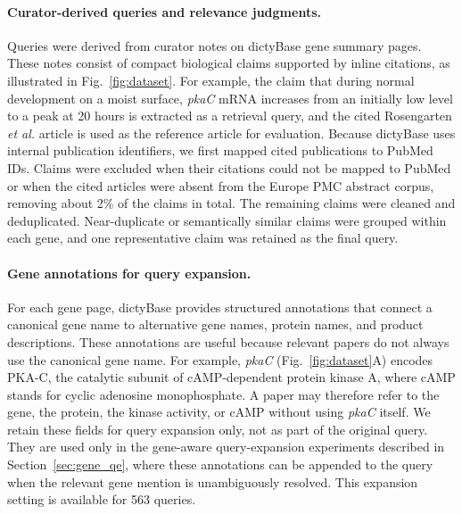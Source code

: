 \documentclass[runningheads]{llncs}
\begin{document}
\paragraph{Curator-derived queries and relevance judgments.}
Queries were derived from curator notes on dictyBase gene summary pages. 
These notes consist of compact biological claims supported by inline citations, as illustrated in Fig.~\ref{fig:dataset}.
For example, the claim that during normal development on a moist surface, \emph{pkaC} mRNA increases from an initially low level to a peak at 20 hours is extracted as a retrieval query, and the cited Rosengarten \emph{et al.} article is used as the reference article for evaluation.
Because dictyBase uses internal publication identifiers, we first mapped cited publications to PubMed IDs. 
Claims were excluded when their citations could not be mapped to PubMed or when the cited articles were absent from the Europe PMC abstract corpus, removing about 2\% of the claims in total.
The remaining claims were cleaned and deduplicated. 
Near-duplicate or semantically similar claims were grouped within each gene, and one representative claim was retained as the final query. 

\paragraph{Gene annotations for query expansion.}
For each gene page, dictyBase provides structured annotations that connect a canonical gene name to alternative gene names, protein names, and product descriptions. These annotations are useful because relevant papers do not always use the canonical gene name. For example, \emph{pkaC} (Fig.~\ref{fig:dataset}A) encodes PKA-C, the catalytic subunit of cAMP-dependent protein kinase A, where cAMP stands for cyclic adenosine monophosphate. A paper may therefore refer to the gene, the protein, the kinase activity, or cAMP without using \emph{pkaC} itself.
We retain these fields for query expansion only, not as part of the original query.
They are used only in the gene-aware query-expansion experiments described in Section~\ref{sec:gene_qe}, where these annotations can be appended to the query when the relevant gene mention is unambiguously resolved. 
This expansion setting is available for 563 queries.
\end{document}
